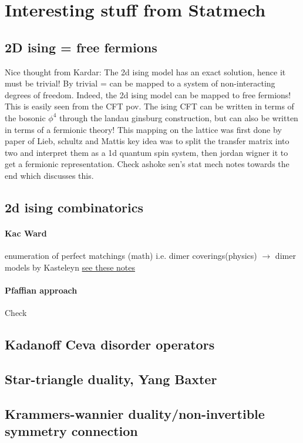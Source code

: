 \documentclass{article}
\begin{document}
\section{Interesting stuff from Statmech}
\subsection{2D ising = free fermions}
Nice thought from Kardar: The 2d ising model has an exact solution, hence it must be trivial! By trivial = can be mapped to a system of non-interacting degrees of freedom. Indeed, the 2d ising model can be mapped to free fermions! This is easily seen from the CFT pov. The ising CFT can be written in terms of the bosonic $\phi^4$ through the landau ginsburg construction, but can also be written in terms of a fermionic theory! This mapping on the lattice was first done by paper of Lieb, schultz and Mattis key idea was to split the transfer matrix into two and interpret them as a 1d quantum spin system, then jordan wigner it to get a fermionic representation. Check ashoke sen's stat mech notes towards the end which discusses this. 
\subsection{2d ising combinatorics}
\paragraph{Kac Ward} enumeration of perfect matchings (math) i.e. dimer coverings(physics) $\to$ dimer models by Kasteleyn \href{https://scholarship.claremont.edu/cgi/viewcontent.cgi?article=1073&context=hmc_theses}{see these notes}
\paragraph{Pfaffian approach}
Check \cite{gobron2013graphtheorypfaffianrepresentations}
\subsection{Kadanoff Ceva disorder operators}
\subsection{Star-triangle duality, Yang Baxter}
\subsection{Krammers-wannier duality/non-invertible symmetry connection}
\cite{681893}
\end{document}
